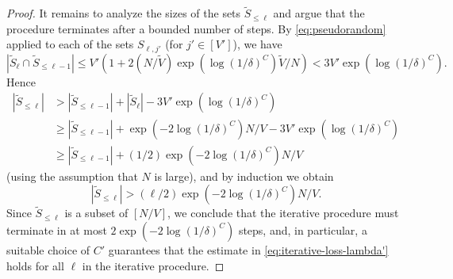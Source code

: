 \documentclass[11pt]{amsart}
\theoremstyle{definition}
\begin{document}
\begin{proof}
It remains to analyze the sizes of the sets $\widetilde S_{\leq \ell}$ and argue that the procedure terminates after a bounded number of steps.  By \eqref{eq:pseudorandom} applied to each of the sets $S_{\ell,j'}$ (for $j' \in [V']$), we have
$$|\widetilde S_\ell \cap \widetilde S_{\leq \ell-1}| \leq V'(1+2(N/\widetilde V)\exp(\log(1/\delta)^C)\widetilde V/N)<3V'\exp(\log(1/\delta)^C).$$
Hence
\begin{align*}
|\widetilde S_{\leq \ell}| &>|\widetilde S_{\leq \ell-1}|+|\widetilde S_\ell|-3V'\exp(\log(1/\delta)^C)\\
 &\geq |\widetilde S_{\leq \ell-1}|+\exp(-2\log(1/\delta)^C)N/V-3V'\exp(\log(1/\delta)^C)\\
 & \geq |\widetilde S_{\leq \ell-1}|+(1/2)\exp(-2\log(1/\delta)^C)N/V
\end{align*}
(using the assumption that $N$ is large), and by induction we obtain
$$|\widetilde S_{\leq \ell}|>(\ell/2)\exp(-2\log(1/\delta)^C)N/V.$$
Since $\widetilde S_{\leq \ell}$ is a subset of $[N/V]$, we conclude that the iterative procedure must terminate in at most $2\exp(-2\log(1/\delta)^C)$ steps, and, in particular, a suitable choice of $C'$ guarantees that the estimate in \eqref{eq:iterative-loss-lambda'} holds for all $\ell$ in the iterative procedure.
\end{proof}
\end{document}
